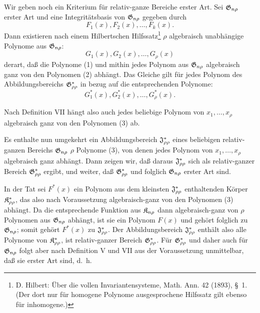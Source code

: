 Wir geben noch ein Kriterium für relativ-ganze Bereiche erster Art. Sei $\mathfrak{G}_{n\rho}$ erster Art und eine Integritätsbasis von $\mathfrak{G}_{n\rho}$ gegeben durch
\begin{equation}
  F_1(x),F_2(x),\ldots,F_k(x).
\tag{1}
\end{equation}
Dann existieren nach einem Hilbertschen Hilfssatz\footnote{D. Hilbert: Über die vollen Invariantensysteme, Math. Ann. 42 (1893), \S\ 1. (Der dort nur für homogene Polynome ausgesprochene Hilfssatz gilt ebenso für inhomogene.)} $\rho$ algebraisch unabhängige Polynome aus $\mathfrak{G}_{n\rho}$:
\begin{equation}
  G_1(x),G_2(x),\ldots,G_\rho(x)
\tag{2}
\end{equation}
derart, daß die Polynome (1) und mithin jedes Polynom aus $\mathfrak{G}_{n\rho}$ algebraisch ganz von den Polynomen (2) abhängt. Das Gleiche gilt für jedes Polynom des Abbildungsbereichs $\mathfrak{G}^*_{\rho\rho}$ in bezug auf die entsprechenden Polynome:
\begin{equation}
  G_1^*(x),G_2^*(x),\ldots,G_\rho^*(x).
\tag{3}
\end{equation}

Nach Definition VII hängt also auch jedes beliebige Polynom von $x_1,
\ldots,x_\rho$ algebraisch ganz von den Polynomen (3) ab.

Es enthalte nun umgekehrt ein Abbildungsbereich $\mathfrak{J}^*_{\rho\rho}$ eines beliebigen relativ-ganzen Bereichs $\mathfrak{G}_{n\rho}$ $\rho$ Polynome (3), von denen jedes Polynom von $x_1,
\ldots,x_\rho$ algebraisch ganz abhängt. Dann zeigen wir, daß daraus $\mathfrak{J}^*_{\rho\rho}$ sich als relativ-ganzer Bereich $\mathfrak{G}^*_{\rho\rho}$ ergibt, und weiter, daß $\mathfrak{G}^*_{\rho\rho}$ und folglich $\mathfrak{G}_{n\rho}$ erster Art sind.

In der Tat sei $F^*(x)$ ein Polynom aus dem kleinsten $\mathfrak{J}^*_{\rho\rho}$ enthaltenden Körper $\mathfrak{K}^*_{\rho\rho}$, das also nach Voraussetzung algebraisch-ganz von den Polynomen (3) abhängt. Da die entsprechende Funktion aus $\mathfrak{K}_{n\rho}$ dann algebraisch-ganz von $\rho$ Polynomen aus $\mathfrak{G}_{n\rho}$ abhängt, ist sie ein Polynom $F(x)$ und gehört folglich zu $\mathfrak{G}_{n\rho}$; somit gehört $F^*(x)$ zu $\mathfrak{J}^*_{\rho\rho}$. Der Abbildungsbereich $\mathfrak{J}^*_{\rho\rho}$ enthält also alle Polynome von $\mathfrak{K}^*_{\rho\rho}$, ist relativ-ganzer Bereich $\mathfrak{G}^*_{\rho\rho}$. Für $\mathfrak{G}^*_{\rho\rho}$ und daher auch für $\mathfrak{G}_{n\rho}$ folgt aber nach Definition V und VII aus der Voraussetzung unmittelbar, daß sie erster Art sind, d.~h.

